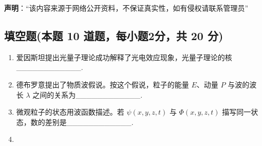 
\textbf{声明}：“该内容来源于网络公开资料，不保证真实性，如有侵权请联系管理员”

\subsection{填空题(本题 10 道题，每小题2分，共 20 分)}
\begin{enumerate}
\item 爱因斯坦提出光量子理论成功解释了光电效应现象，光量子理论的核____________.
\item 德布罗意提出了物质波假说。按这个假说，粒子的能量 $E$、动量 $P$ 与波的波长 $\lambda$ 之间的关系为____________.
\item 微观粒子的状态用波函数描述。若 $\psi(x,y,z,t)$ 与 $\Phi(x,y,z,t)$ 描写同一状态，数的差别是____________.
\item 
\end{enumerate}
